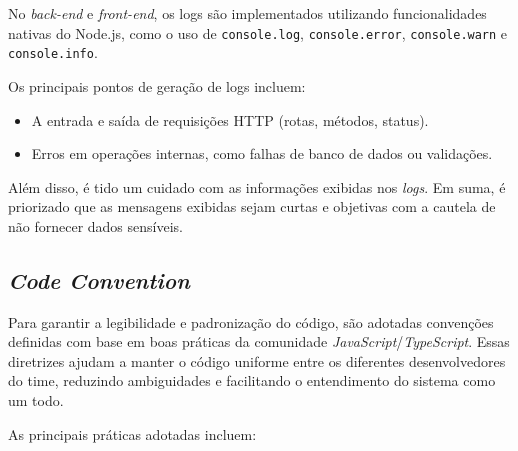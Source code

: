 No \textit{back-end} e \textit{front-end}, os logs são implementados utilizando funcionalidades nativas do Node.js, como o uso de \texttt{console.log}, \texttt{console.error}, \texttt{console.warn} e \texttt{console.info}.

Os principais pontos de geração de logs incluem:
\begin{itemize}
	\item A entrada e saída de requisições HTTP (rotas, métodos, status).
	\item Erros em operações internas, como falhas de banco de dados ou validações.
\end{itemize}

Além disso, é tido um cuidado com as informações exibidas nos \textit{logs}. Em suma, é priorizado que as mensagens exibidas sejam curtas e objetivas com a cautela de não fornecer dados sensíveis.

\subsection{\textit{Code Convention}}
Para garantir a legibilidade e padronização do código, são adotadas convenções definidas com base em boas práticas da comunidade \textit{JavaScript}/\textit{TypeScript}.
Essas diretrizes ajudam a manter o código uniforme entre os diferentes desenvolvedores do time, reduzindo ambiguidades e facilitando o entendimento do sistema como um todo.

As principais práticas adotadas incluem:

